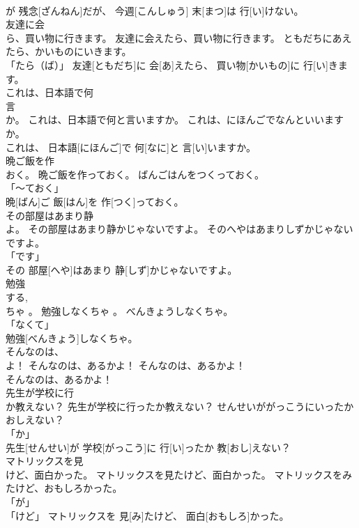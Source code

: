 \documentclass[8pt]{extreport}
\begin{document}
\begin{CJK}{UTF8}{min}
\\	が	残念[ざんねん]だが、 今週[こんしゅう] 末[まつ]は 行[い]けない。		
\\	友達に会
\\	ら、買い物に行きます。	友達に会えたら、買い物に行きます。	ともだちにあえたら、かいものにいきます。	
\\	「たら（ば）」	友達[ともだち]に 会[あ]えたら、 買い物[かいもの]に 行[い]きます。		
\\	これは、日本語で何
\\	言
\\	か。	これは、日本語で何と言いますか。	これは、にほんごでなんといいますか。	
\\	これは、 日本語[にほんご]で 何[なに]と 言[い]いますか。		
\\	晩ご飯を作
\\	おく。	晩ご飯を作っておく。	ばんごはんをつくっておく。	
\\	「～ておく」 
\\	晩[ばん]ご 飯[はん]を 作[つく]っておく。		
\\	その部屋はあまり静
\\	よ。	その部屋はあまり静かじゃないですよ。	そのへやはあまりしずかじゃないですよ。	
\\	「です」 
\\	その 部屋[へや]はあまり 静[しず]かじゃないですよ。		
\\	勉強
\\	する, 
\\	ちゃ 。	勉強しなくちゃ 。	べんきょうしなくちゃ。	
\\	「なくて」
\\	勉強[べんきょう]しなくちゃ。		
\\	そんなのは、
\\	よ！	そんなのは、あるかよ！	そんなのは、あるかよ！	
\\	そんなのは、あるかよ！		
\\	先生が学校に行
\\	か教えない？	先生が学校に行ったか教えない？	せんせいががっこうにいったかおしえない？	
\\	「か」 
\\	先生[せんせい]が 学校[がっこう]に 行[い]ったか 教[おし]えない？		
\\	マトリックスを見
\\	けど、面白かった。	マトリックスを見たけど、面白かった。	マトリックスをみたけど、おもしろかった。	
\\	「が」 
\\	「けど」	マトリックスを 見[み]たけど、 面白[おもしろ]かった。		

\end{CJK}
\end{document}
